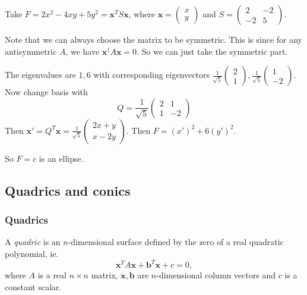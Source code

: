 \documentclass[a4paper]{article}
\begin{document}
\begin{eg}
  Take $F = 2x^2 - 4xy + 5y^2 = \mathbf{x}^TS\mathbf{x}$, where $\mathbf{x} =
  \begin{pmatrix}
    x\\y
  \end{pmatrix}$ and $S =
  \begin{pmatrix}
    2 & -2\\
    -2 & 5
  \end{pmatrix}$.

  Note that we can always choose the matrix to be symmetric. This is since for any antisymmetric $A$, we have $\mathbf{x}^\dagger A\mathbf{x} = 0$. So we can just take the symmetric part.

  The eigenvalues are $1, 6$ with corresponding eigenvectors $
  \displaystyle \frac{1}{\sqrt{5}}\begin{pmatrix}
    2\\1
  \end{pmatrix},\frac{1}{\sqrt{5}}
  \begin{pmatrix}
    1\\-2
  \end{pmatrix}$. Now change basis with
  \[
    Q = \frac{1}{\sqrt{5}}
    \begin{pmatrix}
      2 & 1\\
      1 & -2
    \end{pmatrix}
  \]
  Then $\mathbf{x}' = Q^T\mathbf{x} =
  \frac{1}{\sqrt{5}}\begin{pmatrix}
    2x + y\\x - 2y
  \end{pmatrix}$. Then $F = (x')^2 + 6(y')^2$.

  So $F = c$ is an ellipse.
\end{eg}

\subsection{Quadrics and conics}
\subsubsection{Quadrics}
\begin{defi}[Quadric]
  A \emph{quadric} is an $n$-dimensional surface defined by the zero of a real quadratic polynomial, ie.
  \[
    \mathbf{x}^T A\mathbf{x} + \mathbf{b}^T\mathbf{x} + c = 0,
  \]
  where $A$ is a real $n\times n$ matrix, $\mathbf{x}, \mathbf{b}$ are $n$-dimensional column vectors and $c$ is a constant scalar.
\end{defi}
\end{document}

